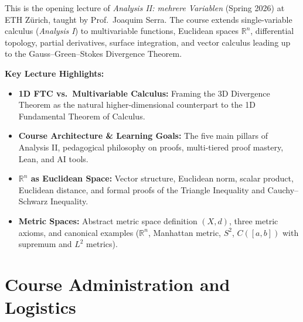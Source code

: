 


\begin{nice-box}
This is the opening lecture of \emph{Analysis II: mehrere Variablen} (Spring 2026) at ETH Zürich, taught by Prof.\ Joaquim Serra. The course extends single-variable calculus (\emph{Analysis I}) to multivariable functions, Euclidean spaces $\mathbb{R}^n$, differential topology, partial derivatives, surface integration, and vector calculus leading up to the Gauss--Green--Stokes Divergence Theorem.

\textbf{Key Lecture Highlights:}
\begin{itemize}
    \item \textbf{1D FTC vs.\ Multivariable Calculus:} Framing the 3D Divergence Theorem as the natural higher-dimensional counterpart to the 1D Fundamental Theorem of Calculus.
    \item \textbf{Course Architecture \& Learning Goals:} The five main pillars of Analysis II, pedagogical philosophy on proofs, multi-tiered proof mastery, Lean, and AI tools.
    \item \textbf{$\mathbb{R}^n$ as Euclidean Space:} Vector structure, Euclidean norm, scalar product, Euclidean distance, and formal proofs of the Triangle Inequality and Cauchy--Schwarz Inequality.
    \item \textbf{Metric Spaces:} Abstract metric space definition $(X, d)$, three metric axioms, and canonical examples ($\mathbb{R}^n$, Manhattan metric, $S^2$, $C([a, b])$ with supremum and $L^2$ metrics).
\end{itemize}
\end{nice-box}

\section{Course Administration and Logistics}

